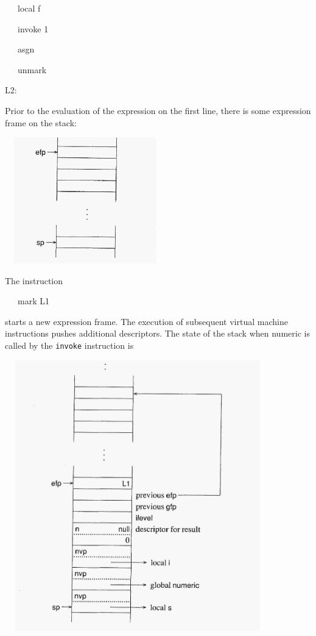 {\ttfamily\mdseries
\ \ \ local f}

{\ttfamily\mdseries
\ \ \ invoke 1}

{\ttfamily\mdseries
\ \ \ asgn}

{\ttfamily\mdseries
\ \ \ unmark}

{\ttfamily\mdseries
L2:}

Prior to the evaluation of the expression on the first line, there is
some expression frame on the stack:

\ \  \includegraphics[width=2.4575in,height=2.1543in]{ib-img/ib-img063.jpg} 

The instruction

{\ttfamily\mdseries
\ \ \ mark L1}

\noindent starts a new expression frame. The execution of subsequent
virtual machine instructions pushes additional descriptors.  The state
of the stack when numeric is called by the \texttt{invoke} instruction is

\ \  \includegraphics[width=4.2752in,height=4.6319in]{ib-img/ib-img064.jpg} 

